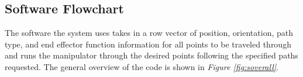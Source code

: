 \subsection{Software Flowchart}
\captionsetup[sub]{
    labelformat=r-parens}
The software the system uses takes in a row vector of position, orientation, path type, and end effector function information for all points to be traveled through and runs the manipulator through the desired points following the specified paths requested. The general overview of the code is shown in \emph{Figure \ref{fig:soverall}}.

